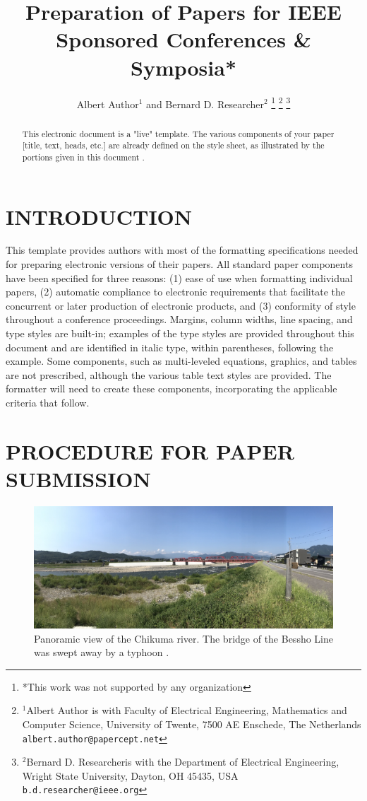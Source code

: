 \documentclass[letterpaper, 10 pt, conference]{ieeeconf}  %
\title{\LARGE \bf
Preparation of Papers for IEEE Sponsored Conferences \& Symposia*
}
\author{Albert Author$^{1}$ and Bernard D. Researcher$^{2}$%
\thanks{*This work was not supported by any organization}%
\thanks{$^{1}$Albert Author is with Faculty of Electrical Engineering, Mathematics and Computer Science,
        University of Twente, 7500 AE Enschede, The Netherlands
        {\tt\small albert.author@papercept.net}}%
\thanks{$^{2}$Bernard D. Researcheris with the Department of Electrical Engineering, Wright State University,
        Dayton, OH 45435, USA
        {\tt\small b.d.researcher@ieee.org}}%
}
\begin{document}
\maketitle
\thispagestyle{empty}
\pagestyle{empty}


\begin{abstract}

This electronic document is a "live" template. The various components of your paper [title, text, heads, etc.] are already defined on the style sheet, as illustrated by the portions given in this document \cite{IEEEexample:articleetal}.

\end{abstract}


\section{INTRODUCTION}

This template provides authors with most of the formatting specifications needed for preparing electronic versions of their papers. All standard paper components have been specified for three reasons: (1) ease of use when formatting individual papers, (2) automatic compliance to electronic requirements that facilitate the concurrent or later production of electronic products, and (3) conformity of style throughout a conference proceedings. Margins, column widths, line spacing, and type styles are built-in; examples of the type styles are provided throughout this document and are identified in italic type, within parentheses, following the example. Some components, such as multi-leveled equations, graphics, and tables are not prescribed, although the various table text styles are provided. The formatter will need to create these components, incorporating the applicable criteria that follow.

\section{PROCEDURE FOR PAPER SUBMISSION}

\begin{figure}
        \centering
        \includegraphics[width=2\columnwidth]{chikuma.jpg}
        \caption{Panoramic view of the Chikuma river. The bridge of the Bessho Line was swept away by a typhoon \cite{toshimitsu2020directional}.}
        \label{fig:chikuma}
\end{figure}
\end{document}
